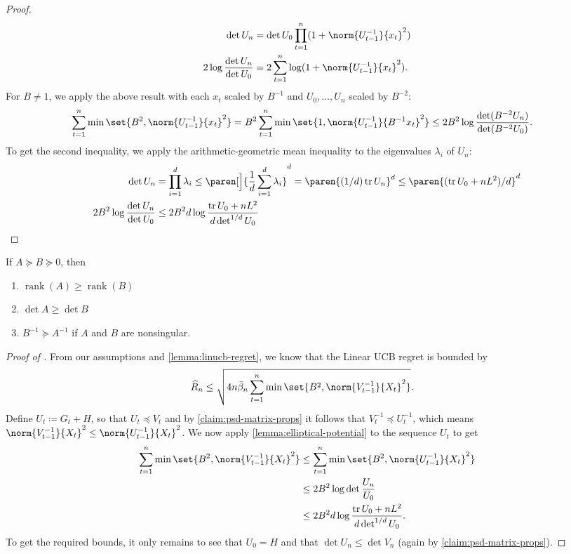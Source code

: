 \documentclass{article}
\newcommand{\defeq}{\coloneq}
\newcommand{\inv}[1]{#1^{-1}}
\DeclareMathOperator{\tr}{tr}
\DeclareMathOperator{\rank}{rank}
\DeclarePairedDelimiter{\paren}()
\begin{document}
\begin{proof}
\begin{align*}
    \det U_n &= \det U_0 \prod_{t=1}^n(1 + \norm{\inv{U_{t-1}}}{x_t}^2) \\
    2\log\frac{\det U_n}{\det U_0} &= 2\sum_{t=1}^n\log(1+\norm{\inv{U_{t-1}}}{x_t}^2).
  \end{align*}
  For $B \neq 1$, we apply the above result with each $x_t$ scaled by
  $B^{-1}$ and $U_0,\dotsc,U_n$ scaled by $B^{-2}$:
  \begin{align*}
    \sum_{t=1}^n\min\set{B^2,\norm{\inv{U_{t-1}}}{x_t}^2}
    &= B^2 \sum_{t=1}^n\min\set{1,\norm{\inv{U_{t-1}}}{B^{-1}x_t}^2}
      \le 2B^2 \log\frac{\det(B^{-2}U_n)}{\det(B^{-2}U_0)}.
  \end{align*}
  To get the second inequality, we apply the arithmetic-geometric
  mean inequality to the eigenvalues $\lambda_i$ of $U_n$:
  \begin{align*}
    \det U_n &= \prod_{i=1}^d \lambda_i
              \le \paren[\Big]{\frac{1}{d} \sum_{i=1}^d \lambda_i}^d
              = \paren{(1/d)\tr U_n}^d
              \le \paren{(\tr U_0 + nL^2)/d}^d \\
    2B^2 \log\frac{\det U_n}{\det U_0}
            &\le 2B^2d \log\frac{\tr U_0 + nL^2}{d\det^{1/d}U_0}
              \qedhere
  \end{align*}
\end{proof}

\begin{lemma}
  \label{claim:psd-matrix-props}%
  If $A \succeq B \succeq 0$, then
  \begin{enumerate}
  \item $\rank(A) \ge \rank(B)$
  \item $\det A \ge \det B$
  \item $\inv{B} \succeq \inv{A}$ if $A$ and $B$ are nonsingular.
  \end{enumerate}
\end{lemma}

\begin{proof}[Proof of ]
  From our assumptions and \cref{lemma:linucb-regret}, we know that
  the Linear UCB regret is bounded by
  \begin{align*}
    \widehat{R}_n &\le \sqrt{4n \bar\beta_n \sum_{t=1}^n\min\set{B^2, \norm{\inv{V_{t-1}}}{X_t}^2}}.
  \end{align*}
  Define $U_t \defeq G_t + H$, so that $U_t \preceq V_t$ and by
  \cref{claim:psd-matrix-props} it follows that
  $\inv{V_t} \preceq \inv{U_t}$, which means
  $\norm{\inv{V_{t-1}}}{X_t}^2 \le \norm{\inv{U_{t-1}}}{X_t}^2$.  We
  now apply \cref{lemma:elliptical-potential} to the sequence $U_t$ to
  get
  \begin{align*}
    \sum_{t=1}^n\min\set{B^2,\norm{\inv{V_{t-1}}}{X_t}^2}
    &\le \sum_{t=1}^n\min\set{B^2,\norm{\inv{U_{t-1}}}{X_t}^2} \\
    &\le 2B^2 \log\det\frac{U_n}{U_0} \\
    &\le 2B^2d \log\frac{\tr U_0 + nL^2}{d \det^{1/d} U_0}.
  \end{align*}
  To get the required bounds, it only remains to see that $U_0 = H$ and
  that $\det U_n \le \det V_n$ (again by
  \cref{claim:psd-matrix-props}).
\end{proof}
\end{document}
